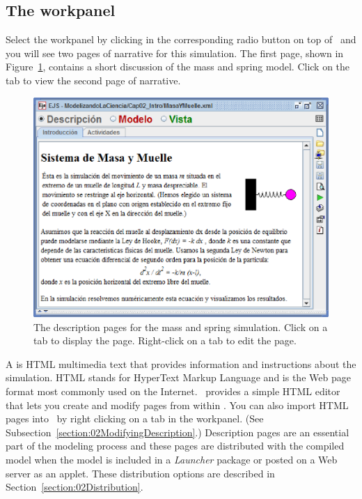 
\subsection{The  workpanel}

Select the  workpanel by clicking in the corresponding radio button on top of
\ejs\ and you will see two pages of narrative for this simulation. The first page, shown in
Figure~\ref{fig:02EjsIntro/SpringDesc}, contains a short discussion of the mass and spring model. Click on the
 tab to view the second page of narrative.

\begin{figure}[htb]
  \centering
  \includegraphics[scale=\scale]{02EjsIntro/images/SpringDesc.eps}
  \caption{The description pages for the mass and spring simulation. Click on a tab to display the page. Right-click on a tab to edit the page.}
  \label{fig:02EjsIntro/SpringDesc}
\end{figure}

A  is HTML multimedia text that provides information and instructions about the
simulation. HTML stands for HyperText Markup Language and is the Web page format most commonly used on the
Internet.  \ejs\ provides a simple HTML editor that lets you create and modify pages from within \ejs.  You can also
import HTML pages into \ejs\ by right clicking on a tab in the  workpanel. (See
Subsection~\ref{section:02ModifyingDescription}.) Description pages are an essential part of the modeling process and
these pages are distributed with the compiled model when the model is included in a \emph{Launcher} package
or posted on a Web server as an applet. These distribution options are described in
Section~\ref{section:02Distribution}.

